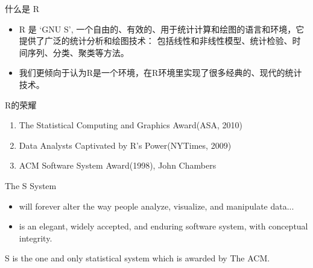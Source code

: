 \documentclass[UTF8,                %
               table,               %
               9pt,                %
               aspectratio=43]      %
               {beamer}
\begin{document}

\begin{frame}{什么是 R}
\begin{itemize}
  \item R 是 `GNU S', 一个自由的、有效的、用于统计计算和绘图的语言和环境，它提供了广泛的统计分析和绘图技术：
      包括线性和非线性模型、统计检验、时间序列、分类、聚类等方法。
  \item \alert{我们更倾向于认为R是一个环境，在R环境里实现了很多经典的、现代的统计技术。}
\end{itemize}
\end{frame}

\begin{frame}{R的荣耀}
  \begin{enumerate}
    \item<1> The Statistical Computing and Graphics Award(ASA, 2010)
    \item<1> Data Analysts Captivated by R's Power(NYTimes, 2009)
    \item<1-2> ACM Software System Award(1998), John Chambers
  \end{enumerate}

      \begin{block}{The S System}
        \begin{itemize}
        \setlength{\itemsep}{-0.00cm}
          \item will forever alter the way people analyze, visualize, and manipulate data...
          \item is an elegant, widely accepted, and enduring software system, with conceptual integrity.
        \end{itemize}

        S is the one and only statistical system which is awarded by The ACM.
      \end{block}
\end{frame}
\end{document}
